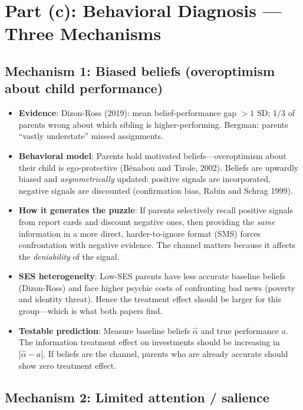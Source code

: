 \documentclass[11pt]{article}
\begin{document}
\section{Part (c): Behavioral Diagnosis --- Three Mechanisms}

\subsection{Mechanism 1: Biased beliefs (overoptimism about child performance)}

\begin{itemize}
  \item \textbf{Evidence}: Dizon-Ross (2019): mean belief-performance gap $>1$ SD; 1/3 of parents wrong about which sibling is higher-performing. Bergman: parents ``vastly understate'' missed assignments.
  \item \textbf{Behavioral model}: Parents hold motivated beliefs---overoptimism about their child is ego-protective (B\'{e}nabou and Tirole, 2002). Beliefs are upwardly biased and \emph{asymmetrically} updated: positive signals are incorporated, negative signals are discounted (confirmation bias, Rabin and Schrag 1999).
  \item \textbf{How it generates the puzzle}: If parents selectively recall positive signals from report cards and discount negative ones, then providing the \emph{same} information in a more direct, harder-to-ignore format (SMS) forces confrontation with negative evidence. The channel matters because it affects the \emph{deniability} of the signal.
  \item \textbf{SES heterogeneity}: Low-SES parents have less accurate baseline beliefs (Dizon-Ross) and face higher psychic costs of confronting bad news (poverty and identity threat). Hence the treatment effect should be larger for this group---which is what both papers find.
  \item \textbf{Testable prediction}: Measure baseline beliefs $\hat{\alpha}$ and true performance $a$. The information treatment effect on investments should be increasing in $|\hat{\alpha} - a|$. If beliefs are the channel, parents who are already accurate should show zero treatment effect.
\end{itemize}

\subsection{Mechanism 2: Limited attention / salience}
\end{document}
